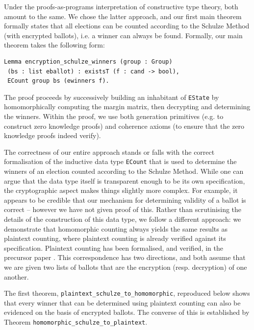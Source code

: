 \documentclass{llncs}
\begin{document}
\noindent
Under the proofs-as-programs interpretation of constructive type
theory, both amount to the same. We chose the latter approach, and
our first main theorem formally states that all elections can be
counted according to the Schulze Method (with encrypted ballots),
i.e. a winner can always be found. Formally, our main theorem takes
the following form:
\begin{lstlisting}[frame=single,basicstyle=\ttfamily\footnotesize]
Lemma encryption_schulze_winners (group : Group) 
 (bs : list eballot) : existsT (f : cand -> bool), 
 ECount group bs (ewinners f).
\end{lstlisting}

\noindent
The proof proceeds by successively building an inhabitant of
\texttt{EState} by homomorphically computing the margin matrix, then
decrypting and determining the winners. Within the proof, we use
both generation primitives (e.g. to construct zero knowledge proofs)
and coherence axioms (to ensure that the zero knowledge proofs
indeed verify). 

The correctness of our entire approach stands or falls with the
correct formalisation of the inductive data type \texttt{ECount}
that is used to determine the winners of an election counted
according to the Schulze Method. While one can argue that the data
type itself is transparent enough to be its own specification,
the cryptographic aspect makes things slightly more complex. For
example, it appears to be credible that our mechanism for
determining validity of a ballot is correct -- however we have not
given proof of this. Rather than scrutinising the details of the
construction of this data type, we follow a different approach: we
demonstrate that homomorphic counting always yields the same results
as plaintext counting, where plaintext counting is already verified
against its specification. Plaintext counting has been formalised,
and verified, in the precursor paper \cite{Pattinson:2017:SVE}. This
correspondence has two directions, and both assume that we are given
two lists of ballots that are the encryption (resp. decryption) of
one another. 

The first theorem, \texttt{plaintext\_schulze\_to\_homomorphic}, reproduced below shows
that every winner that can be determined using plaintext counting
can also be evidenced on the basis of encrypted ballots. The
converse of this is established by 
Theorem \texttt{homomorphic\_schulze\_to\_plaintext}.
\end{document}
